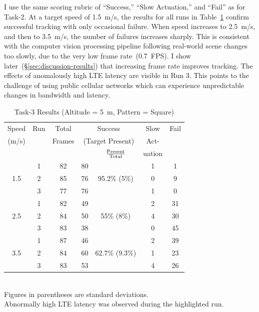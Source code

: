 I use the same scoring rubric of ``Success,'' ``Slow Actuation,'' and
``Fail'' as for Task-2.  At a target speed of 1.5~m/s, the results for
all runs in Table~\ref{tab:task3-results-5m-square} confirm
successful tracking with only occasional failure.  When speed
increases to 2.5~m/s, and then to 3.5~m/s, the number of failures
increases sharply.  This is consistent with the computer vision
processing pipeline following real-world scene changes too slowly, due
to the very low frame rate~(0.7~FPS).  I show
later~(\S\ref{sec:discussion-results}) that increasing frame rate
improves tracking.  The effects of anomalously high LTE latency are
visible in Run 3.  This points to the challenge of using public
cellular networks which can experience unpredictable changes in bandwidth and latency.

\begin{table}
	\centering\small
	\begin{tabular}{|c|c|c|c|c|c|c|}
		\hline
		Speed & Run & Total & \multicolumn{2}{c|}{Success} & Slow & Fail\\
		(m/s) &  & Frames  & \multicolumn{2}{c|}{\footnotesize (Target Present)} & Act- &  \\
		\cline{5-5} 
		&  &         &         & $\rm \frac{Present}{Total}$ & uation  & \\ 
		\hline
		& 1 & 82 & 80 & & 1 & 1 \\
		1.5 & 2 & 85 & 76 & 95.2\% \scriptsize{(5\%)}  & 0 & 9 \\
		& 3 & 77 & 76 & & 1 & 0\\
		\hline
		& 1 & 82 & 49 & & 2 & 31 \\
		2.5 & 2 & 84 & 50 & 55\% \scriptsize{(8\%)} & 4 & 30 \\
		& \cellcolor{red!30}3 & \cellcolor{red!30}83 & \cellcolor{red!30}38 & & \cellcolor{red!30}0 & \cellcolor{red!30}45 \\
		\hline
		& 1 & 87 & 46 & & 2 & 39 \\
		3.5 & 2 & 84 & 60 & 62.7\% \scriptsize{(9.3\%)} & 1 & 23  \\
		& 3 & 83 & 53 & & 4 & 26 \\
		\hline
	\end{tabular}
	\begin{captext}
		\centering \\[0.1cm] Figures in parentheses are standard deviations.\\
		Abnormally high LTE latency was observed during the highlighted run.
	\end{captext}
	\caption{Task-3 Results {\small (Altitude = 5~m, Pattern = Square)}}
	\label{tab:task3-results-5m-square}
\end{table}


